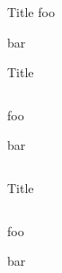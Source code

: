 \documentclass{beamer}
\begin{document}
    \begin{frame}{Title}
        foo

        bar
    \end{frame}

    \begin{frame}{Title}
        \begin{columns}
            \begin{column}{\textwidth}
                foo

                bar
            \end{column}
        \end{columns}
    \end{frame}

    \begin{frame}{Title}
    \begin{columns}
        \begin{column}{\textwidth}\setlength{\parskip}{1cm}%
            foo

            bar
        \end{column}
    \end{columns}
\end{frame}
\end{document}
